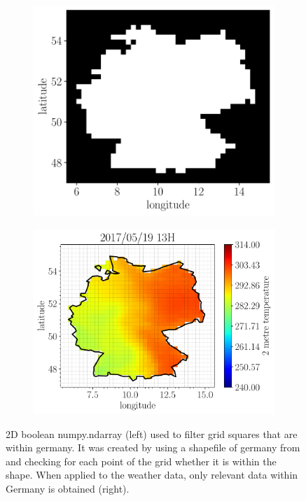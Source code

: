 \begin{figure}[h!]%
	\centering
	\begin{subfigure}{.5\textwidth}
		\centering
		\includegraphics[width=.85\textwidth]{plots/isinDE}%
		\label{fig:isinDE}%
	\end{subfigure}%
	\begin{subfigure}{.5\textwidth}
		\centering
		\includegraphics[width=1.1\textwidth]{plots/t2m/maxvar/0_map_isin}%
		\label{fig:t2m_maxvar_0_map_isin}%
	\end{subfigure}
	\caption[2D boolean numpy.ndarray (left) used to filter grid squares that are within Germany. It was created by using a shapefile of Germany and checking for each point of the grid if it is within the shapefile. When applied to the weather data, only relevant data within Germany is obtained (right).]
	{2D boolean numpy.ndarray (left) used to filter grid squares that are within germany. It was created by using a shapefile of germany from  and checking for each point of the grid whether it is within the shape. When applied to the weather data, only relevant data within Germany is obtained (right).}
	\label{fig:isin_compare}
\end{figure}

